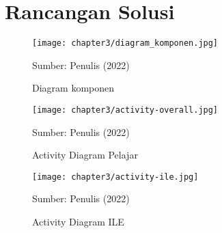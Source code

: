 \section{Rancangan Solusi}


\begin{figure}[!h]
  \centering
  \texttt{[image: chapter3/diagram\_komponen.jpg]}
  \caption{Diagram komponen} \label{fig:diagram-komponen}
  Sumber: Penulis (2022)
\end{figure}


\begin{figure}[!h]
  \centering
  \texttt{[image: chapter3/activity-overall.jpg]}
  \caption{Activity Diagram Pelajar} \label{fig:activity-overall}
  Sumber: Penulis (2022)
\end{figure}


\begin{figure}[!h]
  \centering
  \texttt{[image: chapter3/activity-ile.jpg]}
  \caption{Activity Diagram ILE} \label{fig:activity-ile}
  Sumber: Penulis (2022)
\end{figure}

